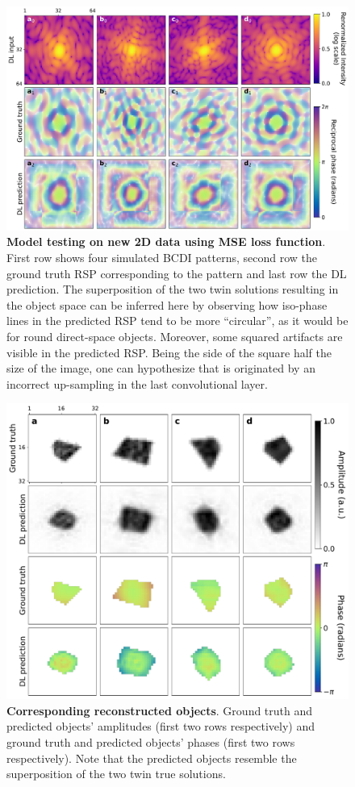 \begin{figure}[H]
    \centering
    \includegraphics[width=.8\textwidth]{figures/Phasing/RSP_low_strain_doubleMSE.pdf}
    \caption{\textbf{Model testing on new 2D data using MSE loss function}. First row shows four simulated BCDI patterns, second row the ground truth RSP 
    corresponding to the pattern and last row the DL prediction. The superposition of the two twin solutions resulting 
    in the object space can be inferred here by observing how iso-phase lines in the predicted RSP tend to be more 
    ``circular'', as it would be for round direct-space objects. Moreover, some squared artifacts are visible in the predicted
    RSP. Being the side of the square half the size of the image, one can hypothesize that is originated by an incorrect 
    up-sampling in the last convolutional layer.}
    \label{fig:RSP_lowStrain_doubleMSE}
\end{figure}
\begin{figure}[H]
    \centering
    \includegraphics[width=.8\textwidth]{figures/Phasing/obj_low_strain_doubleMSE.pdf}
    \caption{\textbf{Corresponding reconstructed objects}. Ground truth and predicted objects' amplitudes (first two rows 
    respectively) and ground truth and predicted objects' phases (first two rows respectively). Note that the predicted 
    objects resemble the superposition of the two twin true solutions.}
    \label{fig:obj_lowStrain_doubleMSE}
\end{figure}


